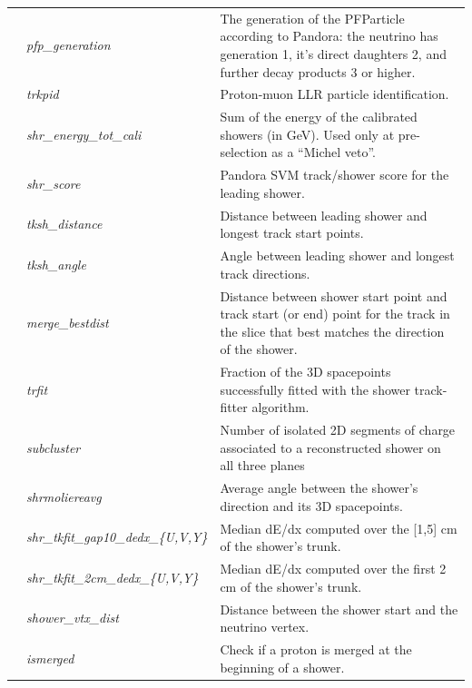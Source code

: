 \begin{table}[ht]
\begin{tabular}{ m{} | m{} | m{}  }
\hline
\multicolumn{1}{l|}{} & \emph{pfp\_generation} & The generation of the PFParticle according to Pandora: the neutrino has generation 1, it's direct daughters 2, and further decay products 3 or higher.\\  \cline{2-3}
\multicolumn{1}{l|}{} & \emph{trkpid}  &  Proton-muon LLR particle identification. \\  \cline{2-3}
\parbox[t]{2mm}{}  & \emph{shr\_energy\_tot\_cali}  & Sum  of  the  energy  of  the  calibrated  showers  (in  GeV). Used  only  at pre-selection as a ``Michel veto”.\\  
 & \emph{shr\_score} & Pandora  SVM track/shower score for the leading shower.\\  
  & \emph{tksh\_distance}  & Distance between leading shower and longest track start points.\\  
 & \emph{tksh\_angle}  & Angle  between  leading  shower   and  longest  track directions.\\  
 & \emph{merge\_bestdist}  & Distance between shower start point and track start (or end) point for the track in the slice that best matches the direction of the shower.\\  
 & \emph{trfit} & Fraction of the 3D spacepoints successfully fitted with the shower track-fitter algorithm. \\  
 & \emph{subcluster} & Number of isolated 2D segments of charge associated to a reconstructed shower on all three planes  \\  
 & \emph{shrmoliereavg} &  Average angle between the shower’s direction and its 3D spacepoints.    \\ 
 & \emph{shr\_tkfit\_gap10\_dedx\_\{U,V,Y\}}  & Median dE/dx computed over the [1,5] cm of the shower’s  trunk. \\ 
 & \emph{shr\_tkfit\_2cm\_dedx\_\{U,V,Y\}}  & Median dE/dx computed  over  the first 2 cm of the shower’s  trunk. \\ 
 & \emph{shower\_vtx\_dist} & Distance between the shower start and the neutrino vertex.\\ 
 & \emph{ismerged} & Check if a proton is merged at the beginning of a shower.\\ 

\end{tabular}
\end{table}
